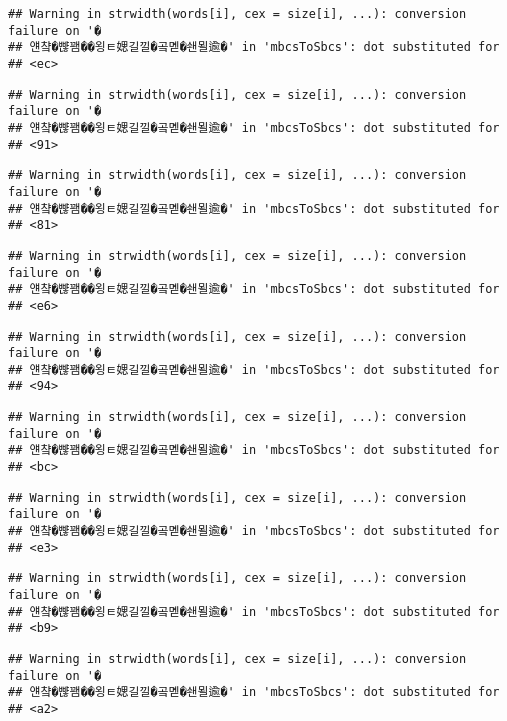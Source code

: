 \documentclass[]{article}
\begin{document}
\begin{verbatim}
## Warning in strwidth(words[i], cex = size[i], ...): conversion failure on '�
## 얜챸�뺞꽴��욍ㅌ媤길낄�곸몓�쇈묄逾�' in 'mbcsToSbcs': dot substituted for
## <ec>
\end{verbatim}

\begin{verbatim}
## Warning in strwidth(words[i], cex = size[i], ...): conversion failure on '�
## 얜챸�뺞꽴��욍ㅌ媤길낄�곸몓�쇈묄逾�' in 'mbcsToSbcs': dot substituted for
## <91>
\end{verbatim}

\begin{verbatim}
## Warning in strwidth(words[i], cex = size[i], ...): conversion failure on '�
## 얜챸�뺞꽴��욍ㅌ媤길낄�곸몓�쇈묄逾�' in 'mbcsToSbcs': dot substituted for
## <81>
\end{verbatim}

\begin{verbatim}
## Warning in strwidth(words[i], cex = size[i], ...): conversion failure on '�
## 얜챸�뺞꽴��욍ㅌ媤길낄�곸몓�쇈묄逾�' in 'mbcsToSbcs': dot substituted for
## <e6>
\end{verbatim}

\begin{verbatim}
## Warning in strwidth(words[i], cex = size[i], ...): conversion failure on '�
## 얜챸�뺞꽴��욍ㅌ媤길낄�곸몓�쇈묄逾�' in 'mbcsToSbcs': dot substituted for
## <94>
\end{verbatim}

\begin{verbatim}
## Warning in strwidth(words[i], cex = size[i], ...): conversion failure on '�
## 얜챸�뺞꽴��욍ㅌ媤길낄�곸몓�쇈묄逾�' in 'mbcsToSbcs': dot substituted for
## <bc>
\end{verbatim}

\begin{verbatim}
## Warning in strwidth(words[i], cex = size[i], ...): conversion failure on '�
## 얜챸�뺞꽴��욍ㅌ媤길낄�곸몓�쇈묄逾�' in 'mbcsToSbcs': dot substituted for
## <e3>
\end{verbatim}

\begin{verbatim}
## Warning in strwidth(words[i], cex = size[i], ...): conversion failure on '�
## 얜챸�뺞꽴��욍ㅌ媤길낄�곸몓�쇈묄逾�' in 'mbcsToSbcs': dot substituted for
## <b9>
\end{verbatim}

\begin{verbatim}
## Warning in strwidth(words[i], cex = size[i], ...): conversion failure on '�
## 얜챸�뺞꽴��욍ㅌ媤길낄�곸몓�쇈묄逾�' in 'mbcsToSbcs': dot substituted for
## <a2>
\end{verbatim}
\end{document}
